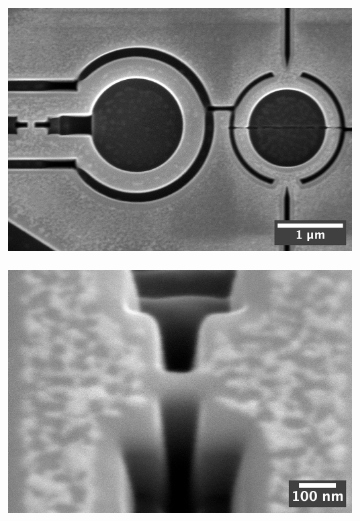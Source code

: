 \begin{figure}[ht!]
	\begin{subfigure}[t]{0.3\textwidth}
		\centering
		\subcaption{}
		\includegraphics[width=\textwidth]{figures/samples/CP1/CP1.2H_SEM_overview.jpg}
	\end{subfigure}
	\hfill
	\begin{subfigure}[t]{0.3\textwidth}
		\centering
		\subcaption{}
		\includegraphics[width=\textwidth]{figures/samples/CP1/CP1.2H_SEM_junction.jpg}
	\end{subfigure}
	\hfill
	\begin{subfigure}[t]{0.3\textwidth}
		\centering
		\subcaption{}

\end{subfigure}
\end{figure}
